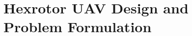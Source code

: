 \documentclass[letterpaper, 10pt, conference]{ieeeconf}
\renewcommand{\Re}{\ensuremath{\mathbb{R}}}
\begin{document}

\section{Hexrotor UAV Design and Problem Formulation}
\label{ProbDef}
%
%
%
%
%
%
%
%
\end{document}
